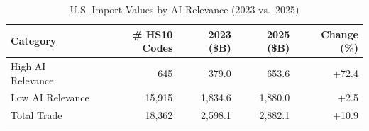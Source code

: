 \begin{table}[htbp]
\centering
\caption{U.S. Import Values by AI Relevance (2023 vs.\ 2025)}
\label{tab:trade_by_relevance}
\setlength{\tabcolsep}{4.5mm}
\renewcommand{\arraystretch}{1.60}
\begin{tabular}{lrrrr}
\toprule
Category & \# HS10 Codes & 2023 (\$B) & 2025 (\$B) & Change (\%) \\
\midrule
High AI Relevance & 645 & 379.0 & 653.6 & +72.4 \\
Low AI Relevance & 15,915 & 1,834.6 & 1,880.0 & +2.5 \\
\midrule
Total Trade & 18,362 & 2,598.1 & 2,882.1 & +10.9 \\
\bottomrule
\end{tabular}
\end{table}
